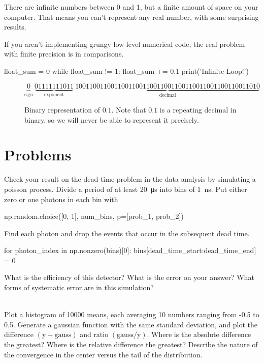 \documentclass[justified, nobib]{tufte-handout}
\begin{document}
There are infinite numbers between 0 and 1, but a finite amount of space on your computer.
That means you can't represent any real number, with some surprising results.



\noindent
If you aren't implementing grungy low level numerical code, the real problem with finite precision is in comparisons.
\begin{pythoncode}
        float_sum = 0
        while float_sum != 1:
            float_sum += 0.1
            print('Infinite Loop!')
\end{pythoncode}
\begin{figure}[!hb]
\small
$$\underbrace{0}_{\text{sign}} \: \underbrace{01111111011}_{\text{exponent}} \: \underbrace{1001100110011001100110011001100110011001100110011010}_{\text{decimal}}$$
\caption{Binary representation of $0.1$. Note that $0.1$ is a repeating decimal in binary, so we will never be able to represent it precisely.}
\end{figure}
\pagebreak

\section*{Problems}


\noindent
Check your result on the dead time problem in the data analysis by simulating a poisson process.
Divide a period of at least \SI{20}{\micro\second} into bins of \SI{1}{\nano\second}. Put either zero or one photons in each bin with
\begin{pythoncode}
        np.random.choice([0, 1], num_bins, p=[prob_1, prob_2])
\end{pythoncode}
Find each photon and drop the events that occur in the subsequent dead time.
\begin{pythoncode}
        for photon_index in np.nonzero(bins)[0]:
            bins[dead_time_start:dead_time_end] = 0
\end{pythoncode}

\noindent
What is the efficiency of this detector?
What is the error on your answer?
What forms of systematic error are in this simulation?

 \\
Plot a histogram of 10000 means, each averaging 10 numbers ranging from -0.5 to 0.5.
Generate a gaussian function with the same standard deviation, and plot the difference $(\text{y} - \text{gauss})$ and ratio $(\text{gauss} / \text{y})$.
Where is the absolute difference the greatest?
Where is the relative difference the greatest?
Describe the nature of the convergence in the center versus the tail of the distribution.
\end{document}

